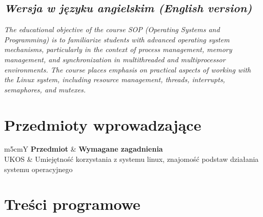 \documentclass[12pt, a4paper]{article}
\newcommand{\thdrule}{\noalign{\global\setlength{\extrarowheight}{0pt}}}
\newcommand{\thdend}{\noalign{\global\setlength{\extrarowheight}{3pt}}}
\begin{document}
\subsection*{\textit{Wersja w języku angielskim (English version)}}

\textit{The educational objective of the course SOP (Operating Systems and Programming) is to familiarize students with advanced operating system mechanisms, particularly in the context of process management, memory management, and synchronization in multithreaded and multiprocessor environments. The course places emphasis on practical aspects of working with the Linux system, including resource management, threads, interrupts, semaphores, and mutexes.}


\section{Przedmioty wprowadzające}

{\scriptsize
\begin{tabularx}{\textwidth}{m{5cm}Y}
\thdrule\toprule
{} {\color{white}\textbf{Przedmiot}} & {\color{white}\textbf{Wymagane zagadnienia}} \\
\midrule\thdend
   UKOS & Umiejętność korzystania z systemu linux, znajomość podstaw działania systemu operacyjnego \\
\bottomrule
\end{tabularx}}

\section{Treści programowe}
\end{document}
